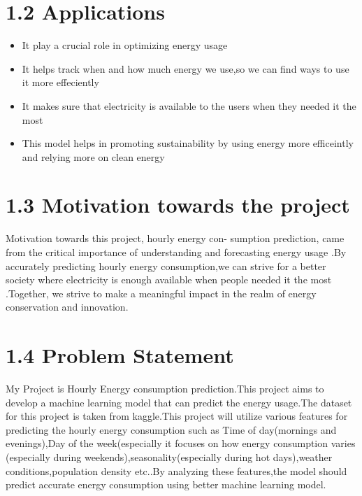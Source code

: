 \documentclass{article}
\begin{document}
\section*{1.2 Applications}

\begin{itemize}
\item It play a crucial role in optimizing energy usage 
\item It helps track when and how much energy we use,so we can find ways to use it more effeciently
\item It makes sure that electricity is available to the users when they needed it the most
\item This model helps in promoting sustainability by using energy more efficeintly and relying more on clean energy
\end{itemize}
\section*{1.3 Motivation towards the project}
Motivation towards this project, hourly energy con-
sumption prediction, came from the critical importance of understanding and forecasting energy usage .By accurately predicting hourly energy consumption,we can strive for a better society where electricity is enough available when people needed it the most .Together, we strive to make a meaningful impact in the realm of energy conservation and innovation.\\

\section*{1.4 Problem  Statement}
My Project is Hourly Energy consumption prediction.This
project aims to develop a machine learning model that
can predict the energy usage.The dataset for this project
is taken from kaggle.This project will utilize various
features for predicting the hourly energy consumption such as Time of day(mornings and evenings),Day of the week(especially it focuses on how energy consumption varies (especially during weekends),seasonality(especially during hot days),weather conditions,population density etc..By analyzing these features,the model should predict accurate energy consumption using better machine learning model.
\newpage
\end{document}
